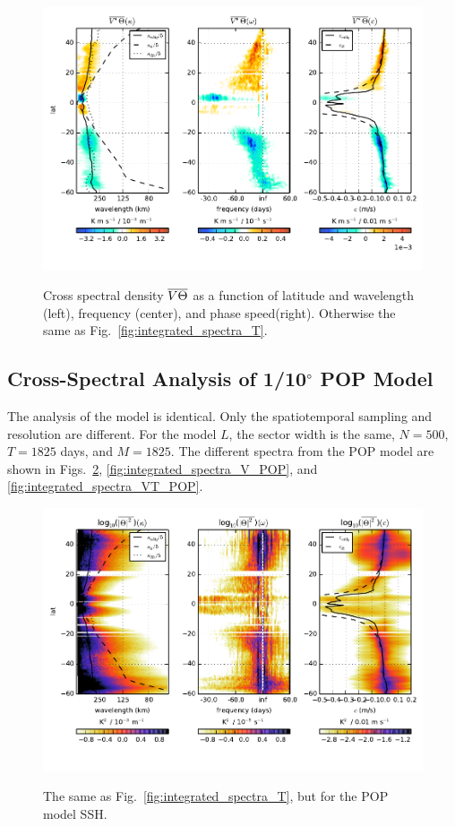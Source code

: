 \documentclass[10pt]{article}
\newcommand{\ol}{\ensuremath{\overline}}
\begin{document}
\begin{figure}[t]
  \noindent\includegraphics{../figures/SAT_50degwide/integrated_spectra_VT.pdf}\\
  \caption{Cross spectral density $\ol{V\Theta}$  as a function of latitude and wavelength (left), frequency (center), and phase speed(right). Otherwise the same as Fig.~\ref{fig:integrated_spectra_T}.}
  \label{fig:integrated_spectra_VT}
\end{figure}

\subsection{Cross-Spectral Analysis of 1/10$^\circ$ POP Model}

The analysis of the model is identical. Only the spatiotemporal sampling and resolution are different. For the model $L$, the sector width is the same, $N = 500$, $T=1825$ days, and $M=1825$. The different spectra from the POP model are shown in Figs.~\ref{fig:integrated_spectra_T_POP}, \ref{fig:integrated_spectra_V_POP}, and \ref{fig:integrated_spectra_VT_POP}.

\begin{figure}[t]
  \noindent\includegraphics{../figures/POP_50degwide/integrated_spectra_T.pdf}\\
  \caption{The same as Fig.~\ref{fig:integrated_spectra_T}, but for the POP model SSH.}
  \label{fig:integrated_spectra_T_POP}
\end{figure}
\end{document}
